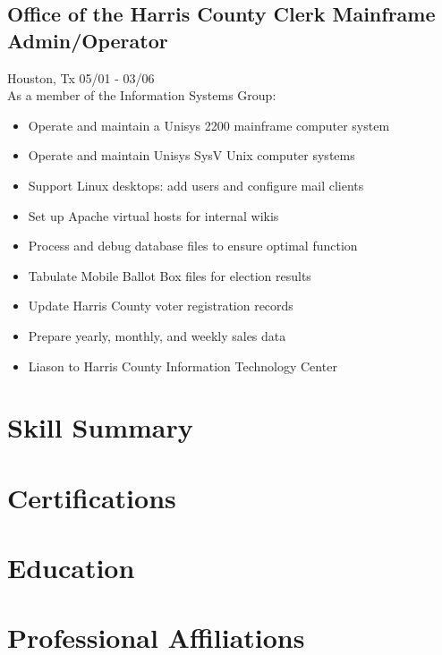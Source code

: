 \documentclass{article}
\begin{document}
  \subsection{Office of the Harris County Clerk \hfill Mainframe Admin/Operator}
  Houston, Tx \hfill 05/01 - 03/06\\
  As a member of the Information Systems Group:\\
  \begin{itemize}
  \item Operate and maintain a Unisys 2200 mainframe computer system
  \item Operate and maintain Unisys SysV Unix computer systems
  \item Support Linux desktops: add users and configure mail clients
  \item Set up Apache virtual hosts for internal wikis
  \item Process and debug database files to ensure optimal function
  \item Tabulate Mobile Ballot Box files for election results
  \item Update Harris County voter registration records
  \item Prepare yearly, monthly, and weekly sales data
  \item Liason to Harris County Information Technology Center
  \end{itemize}


\section{Skill Summary}

\section{Certifications}

\section{Education}

\section{Professional Affiliations}
\end{document}
